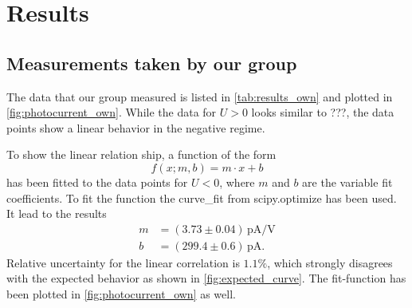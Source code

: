 \section{Results}
\label{sec:results}

\subsection{Measurements taken by our group}
The data that our group measured is listed in \autoref{tab:results_own} and plotted in
\autoref{fig:photocurrent_own}. While the data for $U>0$ looks similar to ???, the data points show
a linear behavior in the negative regime.

To show the linear relation ship, a function of the form
\[
  f(x; m, b) = m\cdot x + b
\]
has been fitted to the data points for $U<0$, where $m$ and $b$ are the variable fit coefficients.
To fit the function the curve\_fit from scipy.optimize has been used. It lead to the results
\begin{align}
  m &= (3.73 \pm 0.04) \, \si{\pico\ampere / \volt} \\
  b &= (299.4 \pm 0.6) \, \si{\pico\ampere}.
\end{align}
Relative uncertainty for the linear correlation is $1.1\%$, which strongly disagrees with the
expected behavior as shown in \autoref{fig:expected_curve}. The fit-function has been plotted in
\autoref{fig:photocurrent_own} as well.

